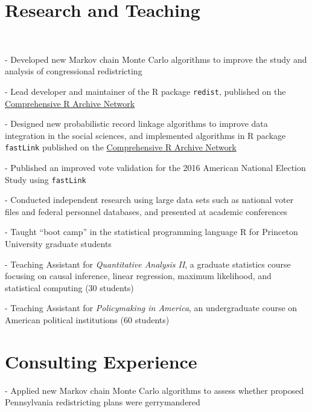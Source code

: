 \documentclass[]{deedy-resume-openfont}
\begin{document}
\begin{minipage}[t]{0.66\textwidth}
\section{Research and Teaching}
\\
\begin{tightemize}
\item[-] Developed new Markov chain Monte Carlo algorithms to improve the study and analysis of congressional redistricting
\item[-] Lead developer and maintainer of the R package \texttt{redist}, published on the \href{http://cran.r-project.org/web/packages/redist/}{Comprehensive R Archive Network}
\item[-] Designed new probabilistic record linkage algorithms to improve data integration in the social sciences, and implemented algorithms in R package \texttt{fastLink} published on the \href{http://cran.r-project.org/web/packages/fastLink/}{Comprehensive R Archive Network}
\item[-] Published an improved vote validation for the 2016 American National Election Study using \texttt{fastLink}
\item[-] Conducted independent research using large data sets such as national voter files and federal personnel databases, and presented at academic conferences
\end{tightemize}
\sectionsep

\begin{tightemize}
\item[-] Taught ``boot camp'' in the statistical programming language R for Princeton University graduate students
\item[-] Teaching Assistant for \textit{Quantitative Analysis II}, a graduate statistics course focusing on causal inference, linear regression, maximum likelihood, and statistical computing (30 students)
\item[-] Teaching Assistant for \textit{Policymaking in America}, an undergraduate course on American political institutions (60 students)
\end{tightemize}

\section{Consulting Experience}
\begin{tightemize}
\item[-] Applied new Markov chain Monte Carlo algorithms to assess whether proposed Pennsylvania redistricting plans were gerrymandered
\end{tightemize}
\sectionsep

\end{minipage} 
\end{document}
